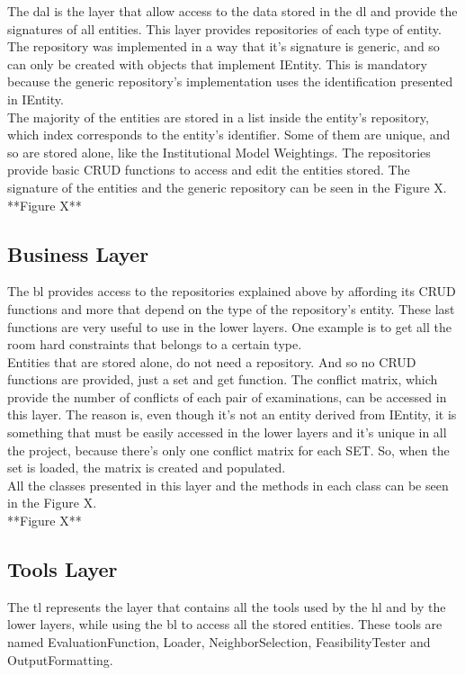 The \gls{dal} is the layer that allow access to the data stored in the \gls{dl} and provide the signatures of all entities. This layer provides repositories of each type of entity. The repository was implemented in a way that it's signature  is generic, and so can only be created with objects that implement IEntity. This is mandatory because the generic repository's implementation uses the identification presented in IEntity. \\

The majority of the entities are stored in a list inside the entity's repository, which index corresponds to the entity's identifier. Some of them are unique, and so are stored alone, like the Institutional Model Weightings. The repositories provide basic CRUD functions to access and edit the entities stored. The signature of the entities and the generic repository can be seen in the {\color{red}Figure X}.\\

{\color{red}**Figure X**}

\subsection{Business Layer}

The \gls{bl} provides access to the repositories explained above by affording its CRUD functions and more that depend on the type of the repository's entity. These last functions are very useful to use in the lower layers. One example is to get all the room hard constraints that belongs to a certain type.\\

Entities that are stored alone, do not need a repository. And so no CRUD functions are provided, just a set and get function. The conflict matrix, which provide the number of conflicts of each pair of examinations, can be accessed in this layer. The reason is, even though it's not an entity derived from IEntity, it is something that must be easily accessed in the lower layers and it's unique in all the project, because there's only one conflict matrix for each SET. So, when the set is loaded, the matrix is created and populated.\\

All the classes presented in this layer and the methods in each class can be seen in the {\color{red}Figure X}.\\

{\color{red}**Figure X**}

\subsection{Tools Layer}
The \gls{tl} represents the layer that contains all the tools used by the \gls{hl} and by the lower layers, while using the \gls{bl} to access all the stored entities. These tools are named EvaluationFunction, Loader, NeighborSelection, FeasibilityTester and OutputFormatting.\\

